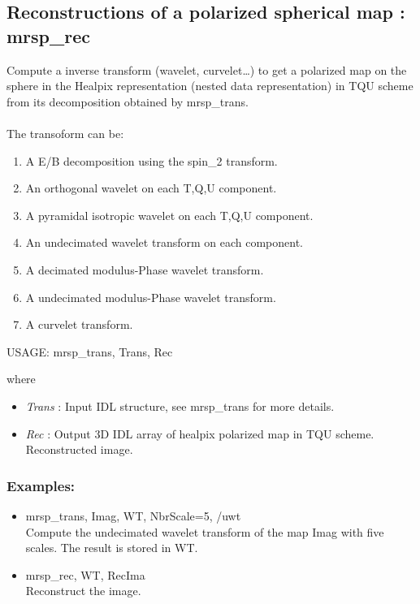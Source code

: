 \subsection{Reconstructions of a polarized spherical map : mrsp\_rec}
Compute a inverse transform (wavelet, curvelet\ldots) to get a polarized map on the sphere in the Healpix representation 
(nested data representation) in TQU scheme from its decomposition obtained by mrsp\_trans.\\ \\
The transoform can be:
\begin{enumerate}
\item A E/B decomposition using the spin\_2 transform.
\item An orthogonal wavelet on each T,Q,U component.
\item A pyramidal isotropic wavelet on each T,Q,U component.
\item An undecimated wavelet transform on each component.
\item A decimated modulus-Phase wavelet transform.
\item A undecimated modulus-Phase wavelet transform.
\item A curvelet transform.
\end{enumerate}
{\bf
\begin{center}
     USAGE: mrsp\_trans, Trans, Rec
\end{center}}
where
\begin{itemize}
\item {\em Trans} : Input IDL structure, see mrsp\_trans for more details.
\item {\em Rec} : Output 3D IDL array of healpix polarized map in TQU scheme. Reconstructed image.
\end{itemize}

\subsubsection*{Examples:} 
\begin{itemize}
\item mrsp\_trans, Imag, WT, NbrScale=5, /uwt \\
Compute the undecimated wavelet transform of the map Imag with five scales. The result is stored in WT.
\item mrsp\_rec, WT, RecIma \\
Reconstruct the image.
\end{itemize}



